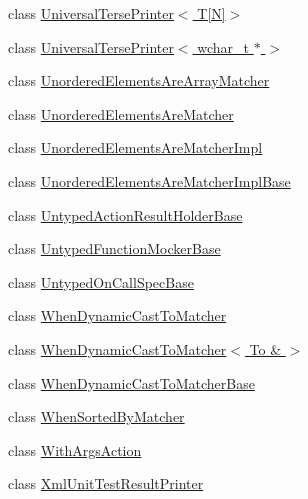 \begin{DoxyCompactItemize}
\item 
class \hyperlink{classtesting_1_1internal_1_1_universal_terse_printer_3_01_t[_n]_4}{Universal\+Terse\+Printer$<$ T\mbox{[}\+N\mbox{]}$>$}
\item 
class \hyperlink{classtesting_1_1internal_1_1_universal_terse_printer_3_01wchar__t_01_5_01_4}{Universal\+Terse\+Printer$<$ wchar\+\_\+t $\ast$ $>$}
\item 
class \hyperlink{classtesting_1_1internal_1_1_unordered_elements_are_array_matcher}{Unordered\+Elements\+Are\+Array\+Matcher}
\item 
class \hyperlink{classtesting_1_1internal_1_1_unordered_elements_are_matcher}{Unordered\+Elements\+Are\+Matcher}
\item 
class \hyperlink{classtesting_1_1internal_1_1_unordered_elements_are_matcher_impl}{Unordered\+Elements\+Are\+Matcher\+Impl}
\item 
class \hyperlink{classtesting_1_1internal_1_1_unordered_elements_are_matcher_impl_base}{Unordered\+Elements\+Are\+Matcher\+Impl\+Base}
\item 
class \hyperlink{classtesting_1_1internal_1_1_untyped_action_result_holder_base}{Untyped\+Action\+Result\+Holder\+Base}
\item 
class \hyperlink{classtesting_1_1internal_1_1_untyped_function_mocker_base}{Untyped\+Function\+Mocker\+Base}
\item 
class \hyperlink{classtesting_1_1internal_1_1_untyped_on_call_spec_base}{Untyped\+On\+Call\+Spec\+Base}
\item 
class \hyperlink{classtesting_1_1internal_1_1_when_dynamic_cast_to_matcher}{When\+Dynamic\+Cast\+To\+Matcher}
\item 
class \hyperlink{classtesting_1_1internal_1_1_when_dynamic_cast_to_matcher_3_01_to_01_6_01_4}{When\+Dynamic\+Cast\+To\+Matcher$<$ To \& $>$}
\item 
class \hyperlink{classtesting_1_1internal_1_1_when_dynamic_cast_to_matcher_base}{When\+Dynamic\+Cast\+To\+Matcher\+Base}
\item 
class \hyperlink{classtesting_1_1internal_1_1_when_sorted_by_matcher}{When\+Sorted\+By\+Matcher}
\item 
class \hyperlink{classtesting_1_1internal_1_1_with_args_action}{With\+Args\+Action}
\item 
class \hyperlink{classtesting_1_1internal_1_1_xml_unit_test_result_printer}{Xml\+Unit\+Test\+Result\+Printer}
\end{DoxyCompactItemize}
